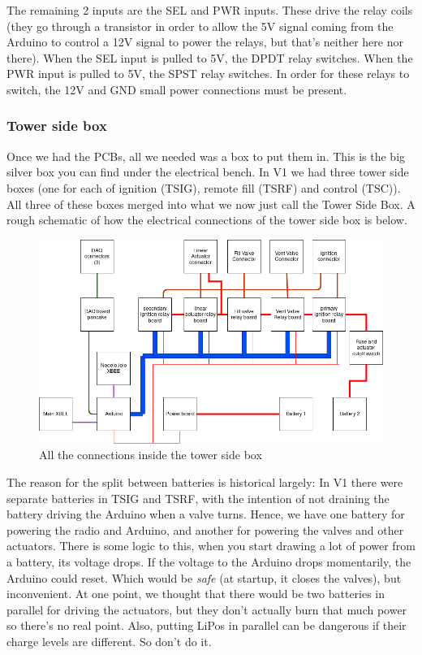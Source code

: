 \documentclass[11pt]{article}
\begin{document}
The remaining 2 inputs are the SEL and PWR inputs. These drive the relay coils
(they go through a transistor in order to allow the 5V signal coming from the
Arduino to control a 12V signal to power the relays, but that's neither here nor
there). When the SEL input is pulled to 5V, the DPDT relay switches. When the
PWR input is pulled to 5V, the SPST relay switches. In order for these relays to
switch, the 12V and GND small power connections must be present.

\subsubsection{Tower side box}
\label{sec:orgcb56c84}

Once we had the PCBs, all we needed was a box to put them in. This is the big
silver box you can find under the electrical bench. In V1 we had three tower
side boxes (one for each of ignition (TSIG), remote fill (TSRF) and control
(TSC)). All three of these boxes merged into what we now just call the Tower
Side Box. A rough schematic of how the electrical connections of the tower side
box is below.

\begin{figure}[htbp]
\centering
\includegraphics[width=.9\linewidth]{./images/tsb_full.png}
\caption{\label{fig:orga8d53f0}
All the connections inside the tower side box}
\end{figure}

The reason for the split between batteries is historical largely: In V1 there
were separate batteries in TSIG and TSRF, with the intention of not draining the
battery driving the Arduino when a valve turns. Hence, we have one battery for
powering the radio and Arduino, and another for powering the valves and other
actuators. There is some logic to this, when you start drawing a lot of power
from a battery, its voltage drops. If the voltage to the Arduino drops
momentarily, the Arduino could reset. Which would be \emph{safe} (at startup, it
closes the valves), but inconvenient. At one point, we thought that there would
be two batteries in parallel for driving the actuators, but they don't actually
burn that much power so there's no real point. Also, putting LiPos in parallel
can be dangerous if their charge levels are different. So don't do it.
\end{document}
